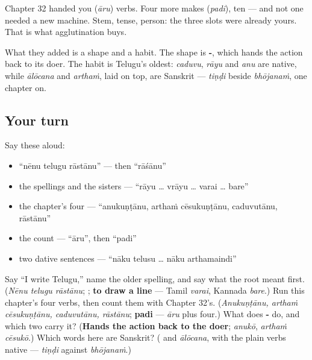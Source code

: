 \begin{grammarlens}[title={Grammar Lens: ten verbs, and one machine}]
Chapter 32 handed you \textbf{} (\emph{āru}) verbs. Four more makes \textbf{} (\emph{padi}), ten — and not one needed a new machine. Stem, tense, person: the three slots were already yours. That is what agglutination buys.

What they added is a shape and a habit. The shape is \textbf{-}, which hands the action back to its doer. The habit is Telugu's oldest: \emph{caduvu}, \emph{rāyu} and \emph{anu} are native, while \emph{ālōcana} and \emph{arthaṁ}, laid on top, are Sanskrit — \emph{tiṇḍi} beside \emph{bhōjanaṁ}, one chapter on.
\end{grammarlens}

\subsection*{Your turn}
Say these aloud:

\begin{itemize}
\raggedright
  \item \textquotedblleft{}nēnu telugu rāstānu\textquotedblright{} — then \textquotedblleft{}rāśānu\textquotedblright{}
  \item the spellings and the sisters — \textquotedblleft{}rāyu … vrāyu … varai … bare\textquotedblright{}
  \item the chapter's four — \textquotedblleft{}anukuṇṭānu, arthaṁ cēsukuṇṭānu, caduvutānu, rāstānu\textquotedblright{}
  \item the count — \textquotedblleft{}āru\textquotedblright{}, then \textquotedblleft{}padi\textquotedblright{}
  \item two dative sentences — \textquotedblleft{}nāku telusu … nāku arthamaindi\textquotedblright{}
\end{itemize}

\begin{tcolorbox}[breakable,colback=teal!4,colframe=teal!35!black,title={Before you move on}]
Say \textquotedblleft{}I write Telugu,\textquotedblright{} name the older spelling, and say what the root meant first. (\emph{Nēnu telugu rāstānu}; \textbf{}; \textbf{to draw a line} — Tamil \emph{varai}, Kannada \emph{bare}.) Run this chapter's four verbs, then count them with Chapter 32's. (\emph{Anukuṇṭānu, arthaṁ cēsukuṇṭānu, caduvutānu, rāstānu}; \textbf{padi} — \emph{āru} plus four.) What does \textbf{-} do, and which two carry it? (\textbf{Hands the action back to the doer}; \emph{anukō}, \emph{arthaṁ cēsukō}.) Which words here are Sanskrit? (\emph{\textbf{}} and \emph{ālōcana}, with the plain verbs native — \emph{tiṇḍi} against \emph{bhōjanaṁ}.)
\end{tcolorbox}
